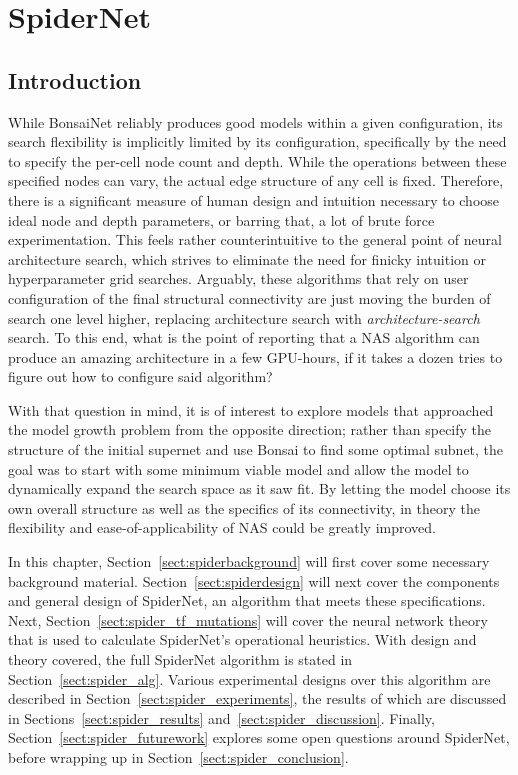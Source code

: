
\graphicspath{{Chapters/spider/figures/}}

\chapter{SpiderNet}\label{chapter:spider}
\section{Introduction}\label{sect:spider_intro}
While BonsaiNet reliably produces good models within a given configuration, its search flexibility is implicitly limited by
its configuration, specifically by the need to specify the per-cell node count and depth. While the operations between
these specified nodes can vary, the actual edge structure of any cell is fixed. Therefore, there is a significant
measure of human design and intuition necessary to choose ideal node and depth parameters, or barring that, a lot of
brute force experimentation. This feels rather counterintuitive to the general point of neural architecture search, which
strives to eliminate the need for finicky intuition or hyperparameter grid searches. Arguably, these algorithms
that rely on user configuration of the final structural connectivity are just moving the burden of search one level
higher, replacing architecture search with \textit{architecture-search} search. To this end, what is the point of reporting that
a NAS algorithm can produce an amazing architecture in a few GPU-hours, if it takes a dozen tries to figure
out how to configure said algorithm?

With that question in mind, it is of interest to explore
models that approached the model growth problem from the opposite direction; rather than specify the structure of the initial
supernet and use Bonsai to find some optimal subnet, the goal was to start with some minimum viable model and allow the model
to dynamically expand the search space as it saw fit. By letting the model choose its own overall structure as well
as the specifics of its connectivity, in theory the flexibility and ease-of-applicability of
NAS could be greatly improved.

In this chapter, Section~\ref{sect:spiderbackground} will first cover some necessary background material.
Section~\ref{sect:spiderdesign} will next cover the components and general design of SpiderNet,
an algorithm that meets these specifications. Next, Section~\ref{sect:spider_tf_mutations} will cover the neural network
theory that is used to calculate SpiderNet's operational heuristics. With design and theory covered, the full SpiderNet
algorithm is stated in Section~\ref{sect:spider_alg}. Various experimental designs over this algorithm are described in
Section~\ref{sect:spider_experiments}, the results of which are discussed in Sections~\ref{sect:spider_results} and~\ref{sect:spider_discussion}. Finally,
Section~\ref{sect:spider_futurework} explores some open questions around SpiderNet, before wrapping up in Section~\ref{sect:spider_conclusion}.

